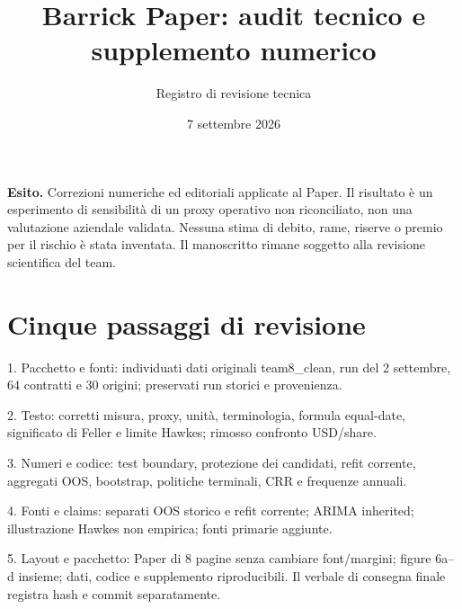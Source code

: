 \documentclass[10pt,a4paper]{article}
\title{Barrick Paper: audit tecnico e supplemento numerico}
\author{Registro di revisione tecnica}\date{7 settembre 2026}
\begin{document}
\maketitle
\textbf{Esito.} Correzioni numeriche ed editoriali applicate al Paper. Il risultato è un esperimento di sensibilità di un proxy operativo non riconciliato, non una valutazione aziendale validata. Nessuna stima di debito, rame, riserve o premio per il rischio è stata inventata. Il manoscritto rimane soggetto alla revisione scientifica del team.
\section{Cinque passaggi di revisione}
1. Pacchetto e fonti: individuati dati originali team8\_clean, run del 2 settembre, 64 contratti e 30 origini; preservati run storici e provenienza.\par
2. Testo: corretti misura, proxy, unità, terminologia, formula equal-date, significato di Feller e limite Hawkes; rimosso confronto USD/share.\par
3. Numeri e codice: test boundary, protezione dei candidati, refit corrente, aggregati OOS, bootstrap, politiche terminali, CRR e frequenze annuali.\par
4. Fonti e claims: separati OOS storico e refit corrente; ARIMA inherited; illustrazione Hawkes non empirica; fonti primarie aggiunte.\par
5. Layout e pacchetto: Paper di 8 pagine senza cambiare font/margini; figure 6a--d insieme; dati, codice e supplemento riproducibili. Il verbale di consegna finale registra hash e commit separatamente.
\end{document}
